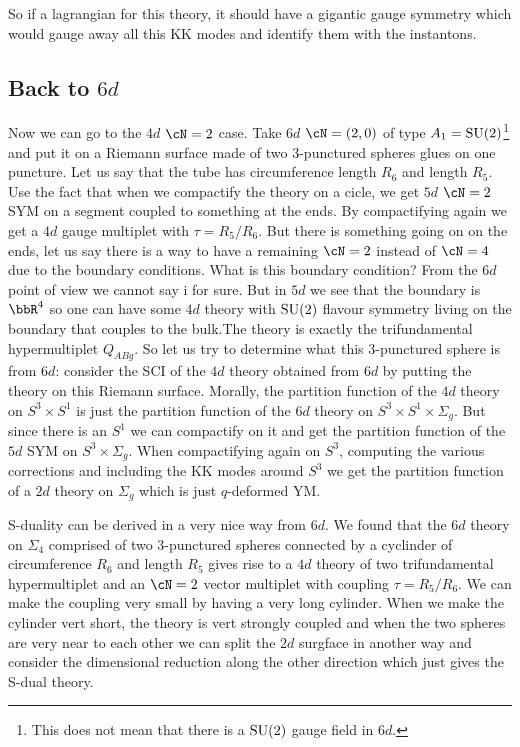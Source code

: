 So if a lagrangian for this theory, it should have a gigantic gauge symmetry which would gauge away all this KK modes and identify them with the instantons. 

\subsection{Back to $6d$}
Now we can go to the $4d$ $\cN=2$ case. Take $6d$ $\cN=(2,0)$ of type $A_1=\mathrm{SU}(2)$\footnote{This does not mean that there is a $\mathrm{SU}(2)$ gauge field in $6d$.} and put it on a Riemann surface made of two $3$-punctured spheres glues on one puncture. Let us say that the tube has circumference length $R_6$ and length $R_5$. Use the fact that when we compactify the theory on a cicle, we get $5d$ $\cN=2$ SYM on a segment coupled to something at the ends. By compactifying again we get a $4d$ gauge multiplet with $\tau=R_5 / R_6$. But there is something going on on the ends, let us say there is a way to have a remaining $\cN=2$ instead of $\cN=4$ due to the boundary conditions. What is this boundary condition? From the $6d$ point of view we cannot say i for sure. But in $5d$ we see that the boundary is $\bbR^4$ so one can have some $4d$ theory with $\mathrm{SU}(2)$ flavour symmetry living on the boundary that couples to the bulk.The theory is exactly the trifundamental hypermultiplet $Q_{ABg}$. So let us try to determine what this $3$-punctured sphere is from $6d$: consider the SCI of the $4d$ theory obtained from $6d$ by putting the theory on this Riemann surface. Morally, the partition function of the $4d$ theory on $S^3\times S^1$ is just the partition function of the $6d$ theory on $S^3\times S^1\times \Sigma_g$. But since there is an $S^1$ we can compactify on it and get the partition function of the $5d$ SYM on $S^3\times \Sigma_g$. When compactifying again on $S^3$, computing the various corrections and including the KK modes around $S^3$ we get the partition function of a $2d$ theory on $\Sigma_g$ which is just $q$-deformed YM.

S-duality can be derived in a very nice way from $6d$. We found that the $6d$ theory on $\Sigma_4$ comprised of two $3$-punctured spheres connected by a cyclinder of circumference $R_6$ and length $R_5 $ gives rise to a $4d$ theory of two trifundamental hypermultiplet and an $\cN=2$ vector multiplet with coupling $\tau= R_5 / R_6$. We can make the coupling very small by having a very long cylinder. When we make the cylinder vert short, the theory is vert strongly coupled and when the two spheres are very near to each other we can split the $2d$ surgface in another way and consider the dimensional reduction along the other direction which just gives the S-dual theory.

